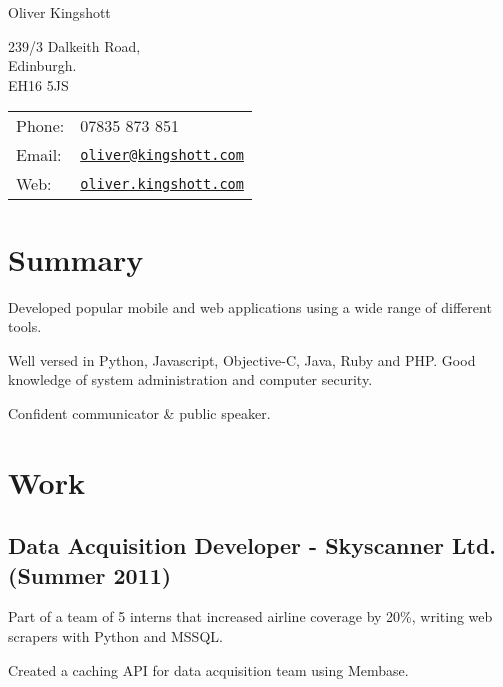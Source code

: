 \documentclass[a4paper]{article}
\def\name{Oliver Kingshott}
\renewenvironment{itemize}{
  \begin{list}{}{
    \setlength{\leftmargin}{1.5em}
  }
}{
  \end{list}
}
\begin{document}
{\huge \name}

\vspace{0.25in}

\begin{minipage}{0.45\linewidth}
  239/3 Dalkeith Road, \\
  Edinburgh. \\
  EH16 5JS
\end{minipage}
\begin{minipage}{0.45\linewidth}
  \begin{tabular}{ll}
    Phone: & 07835 873 851 \\
    Email: & \href{mailto:oliver@kingshott.com}{\tt oliver@kingshott.com} \\
    Web: & \href{http://oliver.kingshott.com/}{\tt oliver.kingshott.com} \\
  \end{tabular}
\end{minipage}

\section*{Summary}
\begin{itemize}
  \item Developed popular mobile and web applications using a wide range of different tools.
  \item Well versed in Python, Javascript, Objective-C, Java, Ruby and PHP. Good knowledge of system administration and computer security.
  \item Confident communicator \& public speaker.
\end{itemize}

\section*{Work}

\subsection*{Data Acquisition Developer - Skyscanner Ltd. (Summer 2011)}
\begin{itemize}
  \item Part of a team of 5 interns that increased airline coverage by 20\%, writing web scrapers with Python and MSSQL.
  \item Created a caching API for data acquisition team using Membase.
\end{itemize}
\end{document}
